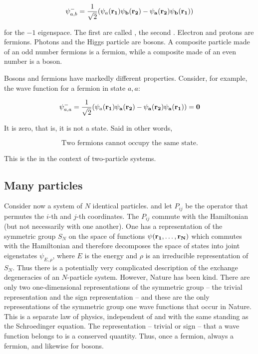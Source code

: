\begin{equation}
\label{fermion}
\psi^-_{a,b}  = \frac{1}{\sqrt 2}(\psi_a(\bf{r}_1)\psi_b(\bf{r}_2) - \psi_a(\bf{r}_2)\psi_b(\bf{r}_1)) 
\end{equation}

for the $-1$ eigenspace.  The first are called , the second .  Electron and protons are fermions. Photons and the Higgs particle are bosons.  A composite particle made of an odd number fermions is a fermion, while a composite made of an even number is a boson.

Bosons and fermions have markedly different properties.  Consider, for example, the wave function for a fermion in state $a, a$:

\begin{equation}
\psi^-_{a,a}  = \frac{1}{\sqrt 2}(\psi_a(\bf{r}_1)\psi_a(\bf{r}_2) - \psi_a(\bf{r}_2)\psi_a(\bf{r}_1)) = 0
\end{equation}

It is zero, that is, it is not a state.  Said in other words, 

\begin{equation}
\text{Two fermions cannot occupy the same state.}
\end{equation}

This is the  in the context of two-particle systems.

\subsection{Many particles}

Consider now a system of $N$ identical particles. and let $P_{ij}$ be the operator that permutes the $i$-th and $j$-th coordinates.  The $P_{ij}$ commute with the Hamiltonian (but not necessarily with one another).  One has a representation of the symmetric group $S_N$ on the space of functions $\psi(\bf{r}_1, \ldots, \bf{r}_N)$ which commutes with the Hamiltonian and therefore decomposes the space of states into joint eigenstates $\psi_{E,\rho}$, where $E$ is the energy and $\rho$ is an irreducible representation of $S_N$.  Thus there is a potentially very complicated description of the exchange degeneracies of an $N$-particle system.  However, Nature has been kind.  There are only two one-dimensional representations of the symmetric group -- the trivial representation and the sign representation -- and these are the only representations of the symmetric group one wave functions that occur in Nature.  This is a separate law of physics, independent of and with the same standing as the Schroedinger equation.  The representation -- trivial or sign -- that a wave function belongs to is a conserved quantity.  Thus, once a fermion, always a fermion, and likewise for bosons.

